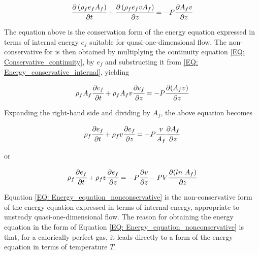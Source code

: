 \documentclass[../Article_Sensitivity_Analsysis.tex]{subfiles}
\begin{document}
	{\footnotesize
		\begin{equation}
			\cfrac{\partial \left( \rho_f e_f A_f \right) }{\partial t} + \cfrac{\partial \left( \rho_f  e_f v A_f \right)}{\partial z} = -P \cfrac{\partial A_f v}{\partial z}
			\label{EQ: Energy_conservative_internal}
		\end{equation}
	}
	
	The equation above is the conservation form of the energy equation expressed in terms of internal energy $e_f$ suitable for quasi-one-dimensional flow. The non-conservative for is then obtained by multiplying the continuity equation \ref{EQ: Conservative_continuity}, by $e_f$ and substructing it from \ref{EQ: Energy_conservative_internal}, yielding 
	
	{\footnotesize
		\begin{equation}
			\rho_f A_f \cfrac{\partial e_f}{\partial t} + \rho_f A_f v \cfrac{\partial e_f}{\partial z} = - P \cfrac{\partial (A_f v) }{\partial z}
		\end{equation}
	}
	
	Expanding the right-hand side and dividing by $A_f$, the above equation becomes 
	
	{\footnotesize
		\begin{equation}
			\rho_f \cfrac{\partial e_f}{\partial t} + \rho_f v \cfrac{\partial e_f}{\partial z} = -P \cfrac{v}{A_f} \cfrac{\partial A_f}{\partial z}
		\end{equation}
	}

	or
	
	{\footnotesize
		\begin{equation}
			\rho_f \cfrac{\partial e_f}{\partial t} + \rho_f v \cfrac{\partial e_f}{\partial z} = -P \cfrac{\partial v}{\partial z} - P V \cfrac{\partial (ln~A_f)}{\partial z}
			\label{EQ: Energy_equation_nonconservative}
		\end{equation}
	}
	
	Equation \ref{EQ: Energy_equation_nonconservative} is the non-conservative form of the energy equation expressed in terms of internal energy, appropriate to unsteady quasi-one-dimensional flow. The reason for obtaining the energy equation in the form of Equation \ref{EQ: Energy_equation_nonconservative} is that, for a calorically perfect gas, it leads directly to a form of the energy equation in terms of temperature $T$. 
%	
%	
%	
	
	
	
	
	
	
	
	
	
	
	
	
	
	
	
\end{document}
